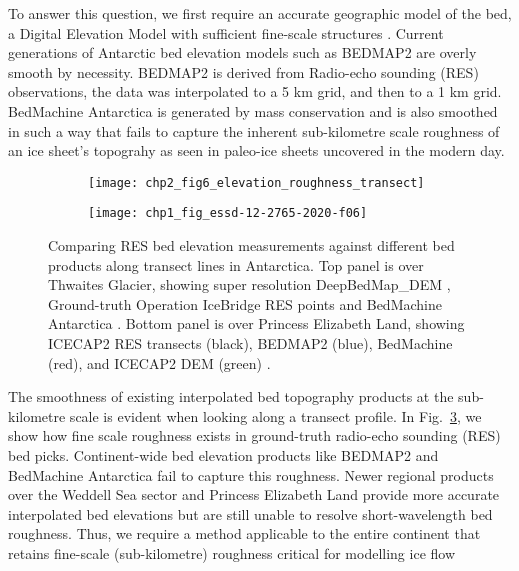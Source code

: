 To answer this question, we first require an accurate geographic model of the bed, a Digital Elevation Model with sufficient fine-scale structures \citep[Chp.~\ref{ch:2},][]{LeongDeepBedMapdeepneural2020}. Current generations of Antarctic bed elevation models such as BEDMAP2 \citep{FretwellBedmap2improvedice2013} are overly smooth by necessity.
BEDMAP2 is derived from Radio-echo sounding (\gls{RES}) observations, the data was interpolated to a 5 km grid, and then to a 1 km grid.
BedMachine Antarctica \citep{MorlighemMEaSUREsBedMachineAntarctica2020} is generated by mass conservation and is also smoothed in such a way that fails to capture the inherent sub-kilometre scale roughness of an ice sheet's topograhy as seen in paleo-ice sheets uncovered in the modern day.

\begin{figure}[htbp]
  \centering
  \begin{subfigure}[t]{0.65\textwidth}
    \texttt{[image: chp2\_fig6\_elevation\_roughness\_transect]}
    \label{fig:1.2a}
  \end{subfigure}
  \vfill
  \begin{subfigure}[t]{0.65\textwidth}
    \texttt{[image: chp1\_fig\_essd-12-2765-2020-f06]}
    \label{fig:1.2b}
  \end{subfigure}
  \caption[Comparison of bed elevation products along ground-truth transects]{
    Comparing \gls{RES} bed elevation measurements against different bed products along transect lines in Antarctica.
    Top panel is over Thwaites Glacier, showing super resolution DeepBedMap\_DEM \citep[purple;][]{LeongDeepBedMapdeepneural2020}, Ground-truth Operation IceBridge \gls{RES} points \citep[orange;][]{ShiMultichannelCoherentRadar2010} and BedMachine Antarctica \citep[green;][]{MorlighemDeepglacialtroughs2019}.
    Bottom panel is over Princess Elizabeth Land, showing ICECAP2 \gls{RES} transects (black), BEDMAP2 (blue), BedMachine (red), and ICECAP2 DEM (green) \citep[Fig. 6 from][, licensed under \href{https://creativecommons.org/licenses/by/4.0}{CC-BY-4.0}]{CuiBedtopographyPrincess2020}.
  }
  \label{fig:1.2}
\end{figure}

The smoothness of existing interpolated bed topography products at the sub-kilometre scale is evident when looking along a transect profile.
In Fig.~\ref{fig:1.2}, we show how fine scale roughness exists in ground-truth radio-echo sounding (\gls{RES}) bed picks.
Continent-wide bed elevation products like BEDMAP2 and BedMachine Antarctica fail to capture this roughness.
Newer regional products over the Weddell Sea sector \citep{Jeofrynewbedelevation2018} and Princess Elizabeth Land \citep{CuiBedtopographyPrincess2020} provide more accurate interpolated bed elevations but are still unable to resolve short-wavelength bed roughness.
Thus, we require a method applicable to the entire continent that retains fine-scale (sub-kilometre) roughness critical for modelling ice flow \citep[see e.g.][]{HubbardSpectralroughnessglaciated2000,SiegertMacroscalebedroughness2004,BinghamDiverselandscapesPine2017,FalciniQuantifyingbedroughness2018}

